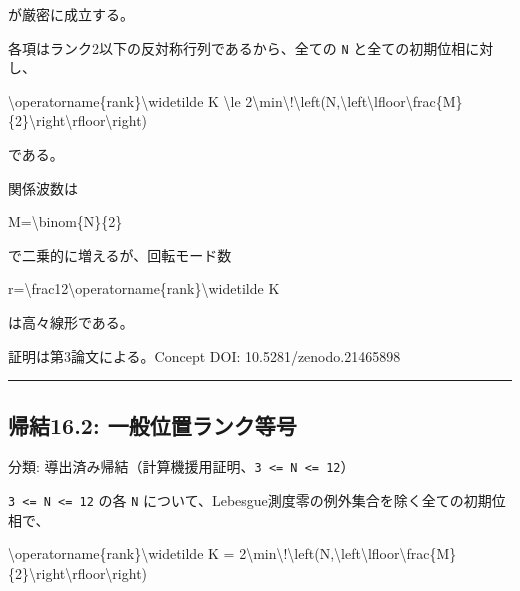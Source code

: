 \documentclass[
  a4paper,
]{ltjsarticle}
\newenvironment{Shaded}{}{}
\newcommand{\NormalTok}[1]{#1}
\begin{document}
が厳密に成立する。

各項はランク2以下の反対称行列であるから、全ての \texttt{N}
と全ての初期位相に対し、

\begin{Shaded}
\begin{Highlighting}[]
\NormalTok{\textbackslash{}operatorname\{rank\}\textbackslash{}widetilde K}
\NormalTok{\textbackslash{}le}
\NormalTok{2\textbackslash{}min\textbackslash{}!\textbackslash{}left(N,\textbackslash{}left\textbackslash{}lfloor\textbackslash{}frac\{M\}\{2\}\textbackslash{}right\textbackslash{}rfloor\textbackslash{}right)}
\end{Highlighting}
\end{Shaded}

である。

関係波数は

\begin{Shaded}
\begin{Highlighting}[]
\NormalTok{M=\textbackslash{}binom\{N\}\{2\}}
\end{Highlighting}
\end{Shaded}

で二乗的に増えるが、回転モード数

\begin{Shaded}
\begin{Highlighting}[]
\NormalTok{r=\textbackslash{}frac12\textbackslash{}operatorname\{rank\}\textbackslash{}widetilde K}
\end{Highlighting}
\end{Shaded}

は高々線形である。

証明は第3論文による。Concept DOI: 10.5281/zenodo.21465898

\begin{center}\rule{0.5\linewidth}{0.5pt}\end{center}

\subsection{帰結16.2:
一般位置ランク等号}\label{ux5e30ux7d5016.2-ux4e00ux822cux4f4dux7f6eux30e9ux30f3ux30afux7b49ux53f7}

分類:
導出済み帰結（計算機援用証明、\texttt{3\ \textless{}=\ N\ \textless{}=\ 12}）

\texttt{3\ \textless{}=\ N\ \textless{}=\ 12} の各 \texttt{N}
について、Lebesgue測度零の例外集合を除く全ての初期位相で、

\begin{Shaded}
\begin{Highlighting}[]
\NormalTok{\textbackslash{}operatorname\{rank\}\textbackslash{}widetilde K}
\NormalTok{=}
\NormalTok{2\textbackslash{}min\textbackslash{}!\textbackslash{}left(N,\textbackslash{}left\textbackslash{}lfloor\textbackslash{}frac\{M\}\{2\}\textbackslash{}right\textbackslash{}rfloor\textbackslash{}right)}
\end{Highlighting}
\end{Shaded}
\end{document}
